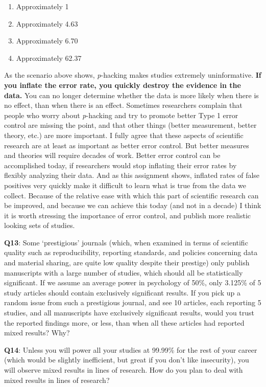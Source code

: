 \documentclass[
  oneside]{book}
\providecommand{\tightlist}{%
  \setlength{\itemsep}{0pt}\setlength{\parskip}{0pt}}
\begin{document}
\begin{enumerate}
\def\labelenumi{\Alph{enumi})}
\tightlist
\item
  Approximately 1
\item
  Approximately 4.63
\item
  Approximately 6.70
\item
  Approximately 62.37
\end{enumerate}

As the scenario above shows, \emph{p}-hacking makes studies extremely uninformative.
\textbf{If you inflate the error rate, you quickly destroy the evidence in the data.} You can no longer determine whether the data is more likely when there is no effect, than when there is an effect. Sometimes researchers complain that people who worry about \emph{p}-hacking and try to promote better Type 1 error control are missing the point, and that other things (better measurement, better theory, etc.) are more important. I fully agree that these aspects of scientific research are at least as important as better error control. But better measures and theories will require decades of work. Better error control can be accomplished today, if researchers would stop inflating their error rates by flexibly analyzing their data. And as this assignment shows, inflated rates of false positives very quickly make it difficult to learn what is true from the data we collect. Because of the relative ease with which this part of scientific research can be improved, and because we can achieve this today (and not in a decade) I think it is worth stressing the importance of error control, and publish more realistic looking sets of studies.

\textbf{Q13}: Some `prestigious' journals (which, when examined in terms of scientific quality such as reproducibility, reporting standards, and policies concerning data and material sharing, are quite low quality despite their prestige) only publish manuscripts with a large number of studies, which should all be statistically significant. If we assume an average power in psychology of 50\%, only 3.125\% of 5 study articles should contain exclusively significant results. If you pick up a random issue from such a prestigious journal, and see 10 articles, each reporting 5 studies, and all manuscripts have exclusively significant results, would you trust the reported findings more, or less, than when all these articles had reported mixed results? Why?

\textbf{Q14}: Unless you will power all your studies at 99.99\% for the rest of your career (which would be slightly inefficient, but great if you don't like insecurity), you will observe mixed results in lines of research. How do you plan to deal with mixed results in lines of research?
\end{document}
